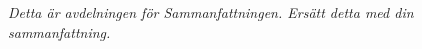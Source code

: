\emph{Detta är avdelningen för Sammanfattningen. Ersätt detta med din sammanfattning.}

\lipsum[2-3]